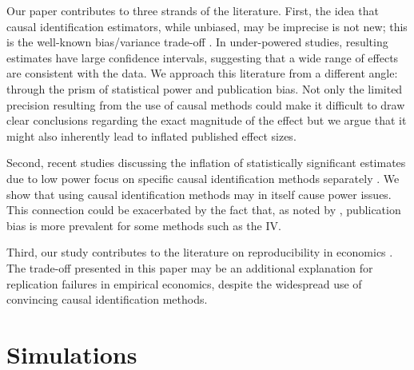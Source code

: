 \documentclass[12pt]{article}
\begin{document}
Our paper contributes to three strands of the literature. First, the idea that causal identification estimators, while unbiased, may be imprecise is not new; this is the well-known bias/variance trade-off \citep{imbens_optimal_2012, deaton_understanding_2018, hernan_causal_2020, ravallion_should_2020}. In under-powered studies, resulting estimates have large confidence intervals, suggesting that a wide range of effects are consistent with the data. We approach this literature from a different angle: through the prism of statistical power and publication bias. Not only the limited precision resulting from the use of causal methods could make it difficult to draw clear conclusions regarding the exact magnitude of the effect but we argue that it might also inherently lead to inflated published effect sizes.

Second, recent studies discussing the inflation of statistically significant estimates due to low power focus on specific causal identification methods separately \citep{schell_evaluating_2018, black_simulated_2021, stommes_reliability_2021, young_leverage_2021}. We show that using causal identification methods may in itself cause power issues. This connection could be exacerbated by the fact that, as noted by \cite{brodeur_methods_2020}, publication bias is more prevalent for some methods such as the IV. 

Third, our study contributes to the literature on reproducibility in economics \citep{camerer_evaluating_2016, ioannidis_power_2017, christensen_transparency_2018, kasy_forking_2021}. The trade-off presented in this paper may be an additional explanation for replication failures in empirical economics, despite the widespread use of convincing causal identification methods.





\section{Simulations} \label{simulations}
\end{document}

